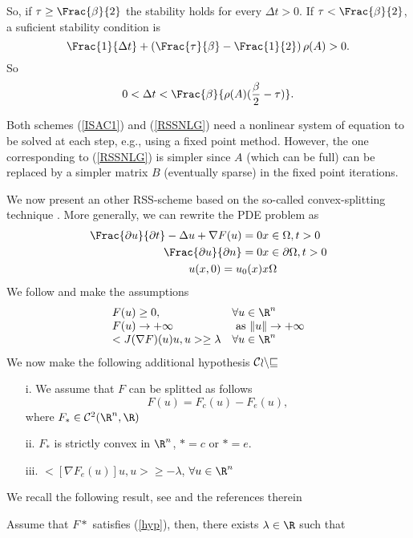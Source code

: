 {\begin{proof_amiens}
$$$$
So, if $\tau \ge \Frac{\beta}{2}$ the stability holds for every $\Delta t>0$. If
$\tau < \Frac{\beta}{2}$, a suficient stability condition is
$$
\Frac{1}{\Delta t}+\left(\Frac{\tau}{\beta} -\Frac{1}{2}\right)\rho(A)> 0.
$$
So
$$
0<\Delta t < \Frac{\beta}{\rho(A)(\frac{\beta}{2}-\tau)}.
$$
\end{proof_amiens}
\begin{remark}
Both schemes (\ref{ISAC1}) and (\ref{RSSNLG}) need a nonlinear system of equation to be solved at each step, e.g., using a fixed point method. However, the one corresponding to (\ref{RSSNLG}) is simpler since $A$ (which can be full) can be replaced by a simpler matrix $B$ (eventually sparse) in the fixed point iterations.
\end{remark}
We now present an other RSS-scheme based on the so-called convex-splitting technique
\cite{Eyre}.
More generally, we can rewrite the PDE problem as
\begin{eqnarray}
\Frac{\partial u}{\partial t} -\Delta u +\nabla F(u)=0& x\in \Omega, t>0\\
\Frac{\partial u}{\partial n}=0 & x \in \partial \Omega, t>0\\
u(x,0)=u_0(x) & x \Omega
\end{eqnarray}
We follow \cite{Eyre} and make the assumptions
\begin{equation}
\begin{array}{ll}
F(u)\ge 0, & \forall u \in \R^n\\
F(u)\rightarrow +\infty & \mbox{ as } \|u\|\rightarrow +\infty\\
<J(\nabla F)(u)u,u> \ge \lambda & \forall u \in \R^n \\
\end{array}
\label{hyp}
\end{equation}
We now make the following additional hypothesis ${\cal Conv}$
\begin{itemize}
\item[i.] We assume that $F$ can be splitted as follows
$$
F(u)=F_c(u)-F_e(u),
$$
where $F_*\in {\cal C}^2(\R^n,\R)$ 
\item[ii.] $F_*$ is strictly convex in $\R^n$, $*=c$ or $*=e$.
\item[iii.] $<[\nabla F_e(u)]u,u>\ge -\lambda$, $\forall u \in \R^n$
\end{itemize}
We recall the following result, see \cite{Eyre} and the references therein
\begin{lemma}\label{LEM1}
Assume that $F*$ satisfies (\ref{hyp}), then, there exists $\lambda \in \R$ such that

\end{lemma}}
